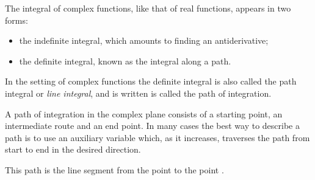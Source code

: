 \EMhold


\begin{EMunit}

The integral of complex functions, like that of real functions, appears in two forms:

\begin{itemize}
\tightlist
\item
  the indefinite integral, which amounts to finding an antiderivative;
\item
  the definite integral, known as the integral along a path.
\end{itemize}

\end{EMunit}

\begin{EMunit}

In the setting of complex functions the definite integral is also called the path integral or \emph{line integral}, and is written
 is called the path of integration.


\end{EMunit}

\EMhold


\begin{EMunit}

A path of integration in the complex plane consists of a starting point, an intermediate route and an end point. In many cases the best way to describe a path is to use an auxiliary variable which, as it increases, traverses the path from start to end in the desired direction.



\end{EMunit}

\begin{EMexample}{}

This path is the line segment from the point  to the point .

\end{EMexample}

